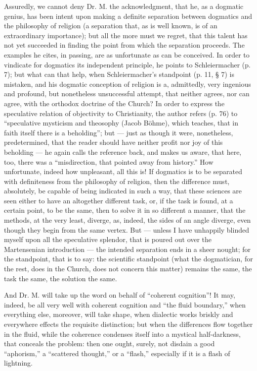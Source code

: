 \documentclass[12pt]{book}
\begin{document}
Assuredly, we cannot deny Dr. M. the acknowledgment, that he, as a dogmatic genius, has been intent
upon making a definite separation between dogmatics and the philosophy of religion (a separation that, as is well known, is of an extraordinary importance); but all the more must we regret, that this talent has not yet succeeded in finding the point from which the separation proceeds. The examples he cites, in passing, are as unfortunate as can be conceived. In order to vindicate for dogmatics its independent principle, he points to Schleiermacher (p. 7); but what can that help, when Schleiermacher's standpoint (p. 11, § 7) is mistaken, and his dogmatic conception of religion is a, admittedly, very ingenious and profound, but nonetheless unsuccessful attempt, that neither agrees, nor can agree, with the orthodox doctrine of the Church? In order to express the speculative relation of objectivity to Christianity, the author refers (p. 76) to ``speculative mysticism and theosophy (Jacob Böhme), which teaches, that in faith itself there is a beholding''; but --- just as though it were, nonetheless, predetermined, that the reader should have neither profit nor joy of this beholding --- he again calls the reference back, and makes us aware, that here, too, there was a ``misdirection, that pointed away from history.'' How unfortunate, indeed how unpleasant, all this is! If dogmatics is to be separated with definiteness from the philosophy of religion, then the difference must, absolutely, be capable of being indicated in such a way, that these sciences are seen either to have an altogether different task, or, if the task is found, at a certain point, to be the same, then to solve it in so different a manner, that the methods, at the very
least, diverge, as, indeed, the sides of an angle diverge, even though they begin from the same vertex. But --- unless I have unhappily blinded myself upon all the speculative splendor, that is poured out over the Martensenian introduction --- the intended separation ends in a sheer nought; for the standpoint, that is to say: the scientific standpoint (what the dogmatician, for the rest, does in the Church, does not concern this matter) remains the same, the task the same, the solution the same.

And Dr. M. will take up the word on behalf of ``coherent cognition''! It may, indeed, be all very well with coherent cognition and ``the fluid boundary,'' when everything else, moreover, will take shape, when dialectic works briskly and everywhere effects the requisite distinction; but when the differences flow together in the fluid, while the coherence condenses itself into a mystical half-darkness, that conceals the problem: then one ought, surely, not disdain a good ``aphorism,'' a ``scattered thought,'' or a ``flash,'' especially if it is a flash of lightning.
\end{document}
